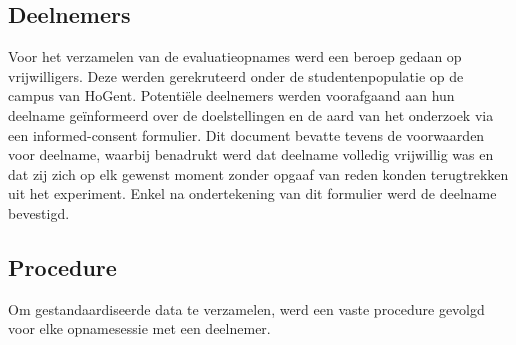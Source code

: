 \subsection{Deelnemers}

Voor het verzamelen van de evaluatieopnames werd een beroep gedaan op vrijwilligers. 
Deze werden gerekruteerd onder de studentenpopulatie op de campus van HoGent. 
Potentiële deelnemers werden voorafgaand aan hun deelname geïnformeerd over de doelstellingen en de aard van het onderzoek 
via een informed-consent formulier. Dit document bevatte tevens de voorwaarden voor deelname, 
waarbij benadrukt werd dat deelname volledig vrijwillig was en dat zij zich op elk gewenst moment zonder 
opgaaf van reden konden terugtrekken uit het experiment. 
Enkel na ondertekening van dit formulier werd de deelname bevestigd.

\subsection{Procedure}

Om gestandaardiseerde data te verzamelen, werd een vaste procedure gevolgd voor elke opnamesessie met een deelnemer.

